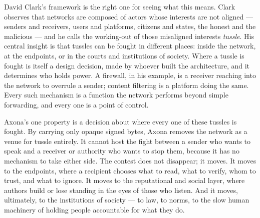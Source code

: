 \documentclass[nobib,justified]{tufte-handout}
\begin{document}
David Clark's framework is the right one for seeing what this means. Clark
observes that networks are composed of actors whose interests are not aligned
--- senders and receivers, users and platforms, citizens and states, the honest
and the malicious --- and he calls the working-out of those misaligned interests
\emph{tussle}. His central insight is that tussles can be fought in different
places: inside the network, at the endpoints, or in the courts and institutions
of society. Where a tussle is fought is itself a design decision, made by whoever
built the architecture, and it determines who holds power. A firewall, in his
example, is a receiver reaching into the network to overrule a sender; content
filtering is a platform doing the same. Every such mechanism is a function the
network performs beyond simple forwarding, and every one is a point of control.

Axona's one property is a decision about where every one of these tussles is
fought. By carrying only opaque signed bytes, Axona removes the network as a
venue for tussle entirely. It cannot host the fight between a sender who wants to
speak and a receiver or authority who wants to stop them, because it has no
mechanism to take either side. The contest does not disappear; it moves. It
moves to the endpoints, where a recipient chooses what to read, what to verify,
whom to trust, and what to ignore. It moves to the reputational and social
layer, where authors build or lose standing in the eyes of those who listen. And
it moves, ultimately, to the institutions of society --- to law, to norms, to
the slow human machinery of holding people accountable for what they do.
\end{document}

